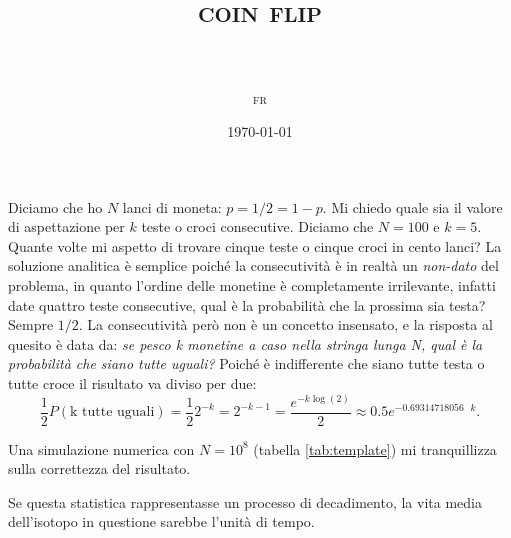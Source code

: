 \documentclass[paper=a4, fontsize=11pt]{scrartcl} %
\title{	
\normalfont \normalsize 
\vspace{5cm}
\horrule{0.5pt} \\[0.4cm] %
\huge \textsc{coin flip} \\ %
\horrule{0.5pt} \\[0.4cm] %
}
\author{\small\textsc{fr}} %
\date{\small\today} %
\numberwithin{equation}{section} %
\numberwithin{figure}{section} %
\numberwithin{table}{section} %
\begin{document}
	

\maketitle

Diciamo che ho $N$ lanci di moneta: $p=1/2 = 1-p$. Mi chiedo quale sia il valore di aspettazione per $k$ teste o croci consecutive. Diciamo che $N=100$ e $k = 5$. Quante volte mi aspetto di trovare cinque teste o cinque croci in cento lanci? La soluzione analitica è semplice poiché la consecutività è in realtà un \emph{non-dato} del problema, in quanto l'ordine delle monetine è completamente irrilevante, infatti date quattro teste consecutive, qual è la probabilità che la prossima sia testa? Sempre $1/2$. La consecutività però non è un concetto insensato, e la risposta al quesito è data da: \emph{se pesco k monetine a caso nella stringa lunga N, qual è la probabilità che siano tutte uguali?} Poiché è indifferente che siano tutte testa o tutte croce il risultato va diviso per due:\[
\frac{1}{2} P(\text{k tutte uguali}) = \frac{1}{2} 2^{-k} = 2^{-k-1} = \frac{e^{-k\log(2)}}{2} \approx 0.5 e^{-0.69314718056\text{ } k}.
\]

Una simulazione numerica con $N=10^8$ (tabella \ref{tab:template}) mi tranquillizza sulla correttezza del risultato.

Se questa statistica rappresentasse un processo di decadimento, la vita media dell'isotopo in questione sarebbe l'unità di tempo.
\end{document}
